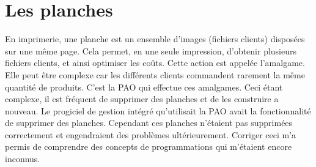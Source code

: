 \section{Les planches}
En imprimerie, une planche est un ensemble d'images (fichiers clients) disposées sur une même page. Cela permet, en une seule impression, d'obtenir plusieurs fichiers clients, et ainsi optimiser les coûts. Cette action est appelée l'amalgame. Elle peut être complexe car les différents clients commandent rarement la même quantité de produits. C'est la PAO qui effectue ces amalgames. Ceci étant complexe, il est fréquent de supprimer des planches et de les construire a nouveau.\newline
Le progiciel de gestion intégré qu'utilisait la PAO avait la fonctionnalité de supprimer des planches. Cependant ces planches n'étaient pas supprimées correctement et engendraient des problèmes ultérieurement. Corriger ceci m'a permis de comprendre des concepts de programmations qui m'étaient encore inconnus.